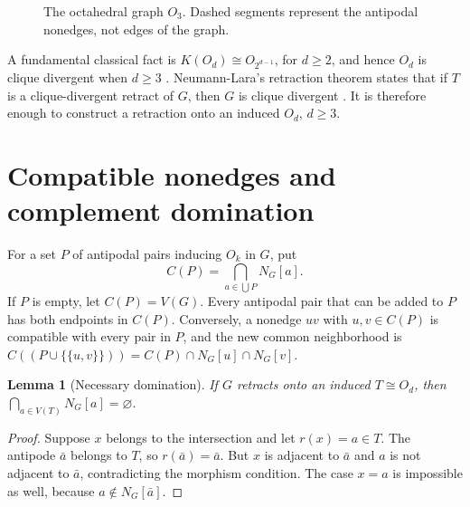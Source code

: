 \documentclass[11pt]{article}
\newtheorem{lemma}[theorem]{Lemma}
\newcommand{\VV}{V(G)}
\newcommand{\CC}[1]{C(#1)}
\begin{document}
\begin{figure}[ht]
\centering
{}
\caption{The octahedral graph \(O_3\). Dashed segments represent the antipodal nonedges, not edges of the graph.}
\label{fig:octahedron}
\end{figure}

A fundamental classical fact is
\(K(O_d)\cong O_{2^{d-1}}\), for \(d\ge2\), and hence
\(O_d\) is clique divergent when \(d\ge3\) \cite{LarPizVil2019,NeuLara1978}.
Neumann-Lara's retraction theorem states that if \(T\) is a
clique-divergent retract of \(G\), then \(G\) is clique divergent
\cite{LarPizVil2008,LarPizVil2019}. It is therefore enough to
construct a retraction onto an induced \(O_d\), \(d\ge3\).

\section{Compatible nonedges and complement domination}
For a set \(P\) of antipodal pairs inducing \(O_k\) in \(G\), put
\[
\CC P=\bigcap_{a\in\bigcup P}N_G[a].
\]
If \(P\) is empty, let \(\CC P=\VV\). Every antipodal pair that can
be added to \(P\) has both endpoints in \(\CC P\). Conversely,
a nonedge \(uv\) with \(u,v\in\CC P\) is compatible with every pair
in \(P\), and the new common neighborhood is
\(\CC{(P\cup\{\{u,v\}\})}=\CC P\cap N_G[u]\cap N_G[v]\).

\begin{lemma}[Necessary domination]\label{lem:domination}
If \(G\) retracts onto an induced \(T\cong O_d\), then
\(\bigcap_{a\in V(T)}N_G[a]=\varnothing\).
\end{lemma}
\begin{proof}
Suppose \(x\) belongs to the intersection and let \(r(x)=a\in T\).
The antipode \(\bar a\) belongs to \(T\), so \(r(\bar a)=\bar a\).
But \(x\) is adjacent to \(\bar a\) and \(a\) is not adjacent to
\(\bar a\), contradicting the morphism condition. The case \(x=a\)
is impossible as well, because \(a\notin N_G[\bar a]\).
\end{proof}
\end{document}
